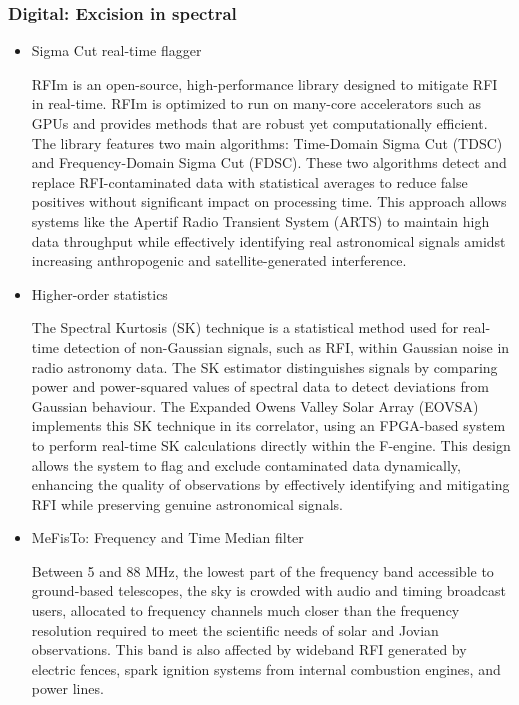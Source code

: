 \subsubsection{Digital: Excision in spectral}
\begin{itemize}
\item Sigma Cut real-time flagger

 RFIm \citep{sclocco2019real} is an open-source, high-performance library designed to mitigate RFI in real-time. RFIm is optimized to run on many-core accelerators such as GPUs and provides methods that are robust yet computationally efficient. The library features two main algorithms: Time-Domain Sigma Cut (TDSC) and Frequency-Domain Sigma Cut (FDSC). These two algorithms detect and replace RFI-contaminated data with statistical averages to reduce false positives without significant impact on processing time. This approach allows systems like the Apertif Radio Transient System (ARTS) to maintain high data throughput while effectively identifying real astronomical signals amidst increasing anthropogenic and satellite-generated interference.
 
\item Higher-order statistics

The Spectral Kurtosis (SK) technique is a statistical method used for real-time detection of non-Gaussian signals, such as RFI, within Gaussian noise in radio astronomy data. The SK estimator distinguishes signals by comparing power and power-squared values of spectral data to detect deviations from Gaussian behaviour. The Expanded Owens Valley Solar Array (EOVSA) implements this SK technique in its correlator, using an FPGA-based system to perform real-time SK calculations directly within the F-engine. This design allows the system to flag and exclude contaminated data dynamically, enhancing the quality of observations by effectively identifying and mitigating RFI while preserving genuine astronomical signals.

\item MeFisTo: Frequency and Time Median filter

Between 5 and 88 MHz, the lowest part of the frequency band accessible to ground-based telescopes, the sky is crowded with audio and timing broadcast users, allocated to frequency channels much closer than the frequency resolution required to meet the scientific needs of solar and Jovian observations. This band is also affected by wideband RFI generated by electric fences, spark ignition systems from internal combustion engines, and power lines.


\end{itemize}
